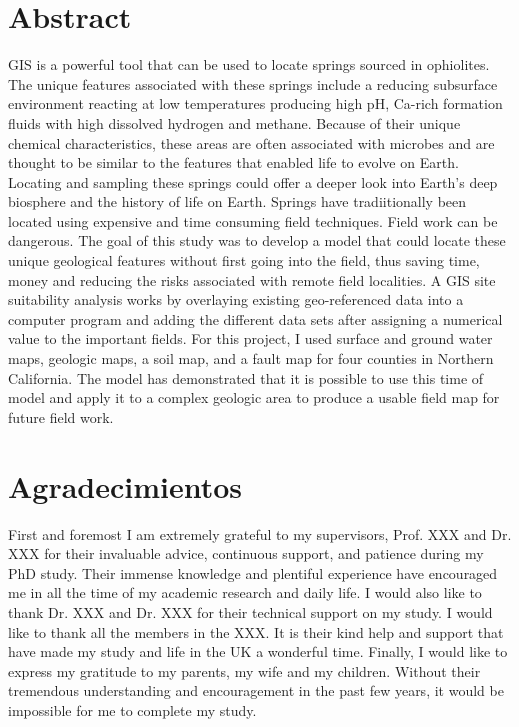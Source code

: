 \documentclass[12pt, a4paper]{report}
\begin{document}
\chapter*{Abstract}
GIS is a powerful tool that can be used to locate springs sourced in ophiolites. The unique features associated with these springs include a reducing subsurface environment reacting at low temperatures producing high pH, Ca-rich formation fluids with high dissolved hydrogen and methane. Because of their unique chemical characteristics, these areas are often associated with microbes and are thought to be similar to the features that enabled life to evolve on Earth. Locating and sampling these springs could offer a deeper look into Earth's deep biosphere and the history of life on Earth. Springs have tradiitionally been located using expensive and time consuming field techniques. Field work can be dangerous. The goal of this study was to develop a model that could locate these unique geological features without first going into the field, thus saving time, money and reducing the risks associated with remote field localities. A GIS site suitability analysis works by overlaying existing geo-referenced data into a computer program and adding the different data sets after assigning a numerical value to the important fields. For this project, I used surface and ground water maps, geologic maps, a soil map, and a fault map for four counties in Northern California. The model has demonstrated that it is possible to use this time of model and apply it to a complex geologic area to produce a usable field map for future field work.

\chapter*{Agradecimientos}
First and foremost I am extremely grateful to my supervisors, Prof. XXX and Dr. XXX for their invaluable advice, continuous support, and patience during my PhD study. Their immense knowledge and plentiful experience have encouraged me in all the time of my academic research and daily life. I would also like to thank Dr. XXX and Dr. XXX for their technical support on my study. I would like to thank all the members in the XXX. It is their kind help and support that have made my study and life in the UK a wonderful time. Finally, I would like to express my gratitude to my parents, my wife and my children. Without their tremendous understanding and encouragement in the past few years, it would be impossible for me to complete my study.
\end{document}
